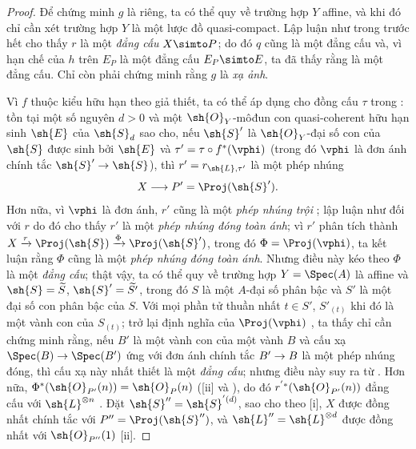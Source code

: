 \documentclass[oneside,10pt]{amsart}
\makeatletter
\newcommand{\ega@arrow}[2]{\mathchoice{#1}{#2}{#2}{#2}}
\renewcommand{\to}{\ega@arrow{\longrightarrow}{\rightarrow}}
\newcommand{\oldpage}[2][]{\marginnote{\normalfont\footnotesize\textbf{#1}~|~#2}\ignorespaces}
\makeatother
\begin{document}
\begin{proof}
Để chứng minh $g$ là riêng, ta có thể quy về trường hợp $Y$ affine, và khi đó chỉ cần xét trường hợp $Y$ là một lược đồ quasi-compact.
Lập luận như trong  trước hết cho thấy $r$ là một \emph{đẳng cấu} $X\simto P$;
do đó $q$ cũng là một đẳng cấu và, vì hạn chế của $h$ trên $E_P$ là một đẳng cấu $E_P\simto E$, ta đã thấy rằng  là một đẳng cấu.
Chỉ còn phải chứng minh rằng $g$ là \emph{xạ ảnh}.

Vì $f$ thuộc kiểu hữu hạn theo giả thiết, ta có thể áp dụng  cho đồng cấu
\oldpage[II]{180}
$\tau$ trong :
tồn tại một số nguyên $d>0$ và một $\sh{O}_Y$-môđun con quasi-coherent hữu hạn sinh $\sh{E}$ của $\sh{S}_d$ sao cho, nếu $\sh{S}'$ là $\sh{O}_Y$-đại số con của $\sh{S}$ được sinh bởi $\sh{E}$ và $\tau'=\tau\circ f^*(\vphi)$ (trong đó $\vphi$ là đơn ánh chính tắc $\sh{S}'\to\sh{S}$), thì $r'=r_{\sh{L},\tau'}$ là một phép nhúng
\[
  X\to P'=\Proj(\sh{S}').
\]
Hơn nữa, vì $\vphi$ là đơn ánh, $r'$ cũng là một \emph{phép nhúng trội} ;
lập luận như đối với $r$ do đó cho thấy $r'$ là một \emph{phép nhúng đóng toàn ánh};
vì $r'$ phân tích thành $X\xrightarrow{r}\Proj(\sh{S})\xrightarrow{\Phi}\Proj(\sh{S}')$, trong đó $\Phi=\Proj(\vphi)$, ta kết luận rằng $\Phi$ cũng là một \emph{phép nhúng đóng toàn ánh}.
Nhưng điều này kéo theo $\Phi$ là một \emph{đẳng cấu};
thật vậy, ta có thể quy về trường hợp $Y=\Spec(A)$ là affine và $\sh{S}=\widetilde{S}$, $\sh{S}'=\widetilde{S'}$, trong đó $S$ là một $A$-đại số phân bậc và $S'$ là một đại số con phân bậc của $S$.
Với mọi phần tử thuần nhất $t\in S'$, $S'_{(t)}$ khi đó là một vành con của $S_{(t)}$;
trở lại định nghĩa của $\Proj(\vphi)$ , ta thấy chỉ cần chứng minh rằng, nếu $B'$ là một vành con của một vành $B$ và cấu xạ $\Spec(B)\to\Spec(B')$ ứng với đơn ánh chính tắc $B'\to B$ là một phép nhúng đóng, thì cấu xạ này nhất thiết là một \emph{đẳng cấu};
nhưng điều này suy ra từ .
Hơn nữa, $\Phi^*(\sh{O}_{P'}(n))=\sh{O}_P(n)$ ([ii] và ), do đó $r^{'*}(\sh{O}_{P'}(n))$ đẳng cấu với $\sh{L}^{\otimes n}$ .
Đặt $\sh{S}''=\sh{S}^{'(d)}$, sao cho theo [i], $X$ được đồng nhất chính tắc với $P''=\Proj(\sh{S}'')$, và $\sh{L}''=\sh{L}^{\otimes d}$ được đồng nhất với $\sh{O}_{P''}(1)$ [ii].


\end{proof}
\end{document}
